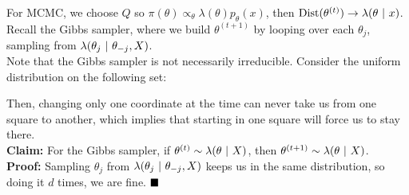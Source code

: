 
For MCMC, we choose $Q$ so $\pi(\theta) \propto_{\theta} \lambda(\theta)p_{\theta}(x)$, then $\text{Dist}(\theta^{(t)}) \to \lambda(\theta \ |\  x)$.\\

Recall the Gibbs sampler, where we build $\theta^{(t + 1)}$ by looping over each $\theta_j$, sampling from $\lambda(\theta_j \ |\  \theta_{-j}, X)$.\\

Note that the Gibbs sampler is not necessarily irreducible. Consider the uniform distribution on the following set:
\begin{center}
\end{center}
Then, changing only one coordinate at the time can never take us from one square to another, which implies that starting in one square will force us to stay there. \\

\textbf{Claim:} For the Gibbs sampler, if $\theta^{(t)} \sim \lambda(\theta \ |\  X)$, then $\theta^{(t + 1)} \sim \lambda(\theta \ |\  X)$.\\

\textbf{Proof:} Sampling $\theta_j$ from $\lambda(\theta_j \ |\  \theta_{-j}, X)$ keeps us in the same distribution, so doing it $d$ times, we are fine. $\qed$

